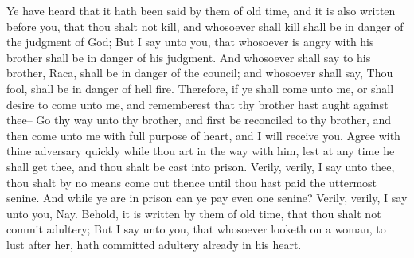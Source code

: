 Ye have heard that it hath been said by them of old time, and it is also written before you, that thou shalt not kill, and whosoever shall kill shall be in danger of the judgment of God;
\bverse \iffalse But I say unto you, that whosoever is angry with his brother shall be in danger of his judgment. And whosoever shall say to his brother, Raca, shall be in danger of the council; and whosoever shall say, Thou fool, shall be in danger of hell fire. \fi
But I say unto you, that whosoever is angry with his brother shall be in danger of his judgment. And whosoever shall say to his brother, Raca, shall be in danger of the council; and whosoever shall say, Thou fool, shall be in danger of hell fire.
\bverse \iffalse Therefore, if ye shall come unto me, or shall desire to come unto me, and rememberest that thy brother hast aught against thee-- \fi
Therefore, if ye shall come unto me, or shall desire to come unto me, and rememberest that thy brother hast aught against thee--
\bverse \iffalse Go thy way unto thy brother, and first be reconciled to thy brother, and then come unto me with full purpose of heart, and I will receive you. \fi
Go thy way unto thy brother, and first be reconciled to thy brother, and then come unto me with full purpose of heart, and I will receive you.
\bverse \iffalse Agree with thine adversary quickly while thou art in the way with him, lest at any time he shall get thee, and thou shalt be cast into prison. \fi
Agree with thine adversary quickly while thou art in the way with him, lest at any time he shall get thee, and thou shalt be cast into prison.
\bverse \iffalse Verily, verily, I say unto thee, thou shalt by no means come out thence until thou hast paid the uttermost senine. And while ye are in prison can ye pay even one senine? Verily, verily, I say unto you, Nay. \fi
Verily, verily, I say unto thee, thou shalt by no means come out thence until thou hast paid the uttermost senine. And while ye are in prison can ye pay even one senine? Verily, verily, I say unto you, Nay.
\bverse \iffalse Behold, it is written by them of old time, that thou shalt not commit adultery; \fi
Behold, it is written by them of old time, that thou shalt not commit adultery;
\bverse \iffalse But I say unto you, that whosoever looketh on a woman, to lust after her, hath committed adultery already in his heart. \fi
But I say unto you, that whosoever looketh on a woman, to lust after her, hath committed adultery already in his heart.
\bverse \iffalse Behold, I give unto you a commandment, that ye suffer none of these things to enter into your heart; \fi
